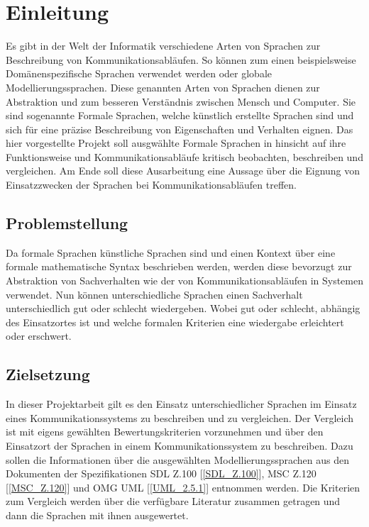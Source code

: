 \chapter{Einleitung}
Es gibt in der Welt der Informatik verschiedene Arten von Sprachen zur Beschreibung von Kommunikationsabläufen. So können zum einen beispielsweise Domänenspezifische Sprachen verwendet werden oder globale Modellierungssprachen. Diese genannten Arten von Sprachen dienen zur Abstraktion und zum besseren Verständnis zwischen Mensch und Computer. Sie sind sogenannte Formale Sprachen, welche künstlich erstellte Sprachen sind und sich für eine präzise Beschreibung von Eigenschaften und Verhalten eignen. Das hier vorgestellte Projekt soll ausgwählte Formale Sprachen in hinsicht auf ihre Funktionsweise und  Kommunikationsabläufe kritisch beobachten, beschreiben und vergleichen. Am Ende soll diese Ausarbeitung eine Aussage über die Eignung von Einsatzzwecken der Sprachen bei Kommunikationsabläufen treffen.

\section{Problemstellung}
Da formale Sprachen künstliche Sprachen sind und einen Kontext über eine formale mathematische Syntax beschrieben werden, werden diese bevorzugt zur Abstraktion von Sachverhalten wie der von Kommunikationsabläufen in Systemen verwendet. Nun können unterschiedliche Sprachen einen Sachverhalt unterschiedlich gut oder schlecht wiedergeben. Wobei gut oder schlecht, abhängig des Einsatzortes ist und welche formalen Kriterien eine wiedergabe erleichtert oder erschwert.

\section{Zielsetzung}
In dieser Projektarbeit gilt es den Einsatz unterschiedlicher Sprachen im Einsatz eines Kommunikationssystems zu beschreiben und zu vergleichen. Der Vergleich ist mit eigens gewählten Bewertungskriterien vorzunehmen und über den Einsatzort der Sprachen in einem Kommunikationssystem zu beschreiben. Dazu sollen die Informationen über die ausgewählten Modellierungssprachen aus den Dokumenten der Spezifikationen \acs{SDL} Z.100 [\ref{SDL_Z.100}], \acs{MSC} Z.120 [\ref{MSC_Z.120}] und OMG \acs{UML} [\ref{UML_2.5.1}] entnommen werden. Die Kriterien zum Vergleich werden über die verfügbare Literatur zusammen getragen und dann die Sprachen mit ihnen ausgewertet.

